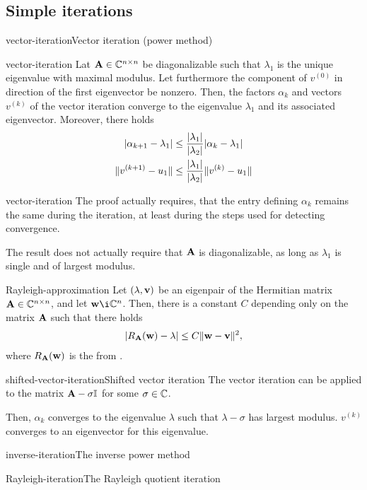 
\subsection{Simple iterations}

\begin{Algorithm*}{vector-iteration}{Vector iteration (power method)}
  
\end{Algorithm*}

\begin{Theorem}{vector-iteration}
  Lat $\mathbf A\in\mathbb C^{n\times n}$ be diagonalizable such that $\lambda_1$ is the
  unique eigenvalue with maximal modulus. Let furthermore the
  component of $v^{(0)}$ in direction of the first eigenvector be
  nonzero. Then, the factors $\alpha_k$ and vectors $v^{(k)}$ of the
  vector iteration converge to the eigenvalue $\lambda_1$ and its
  associated eigenvector. Moreover, there holds
  \begin{align}
    \lvert\alpha_{k+1}-\lambda_1\rvert
    &\le \frac{\lvert\lambda_1\rvert}{\lvert\lambda_2\rvert} \lvert\alpha_{k}-\lambda_1\rvert\\
    \lVert v^{(k+1)}-u_1\rVert
    &\le \frac{\lvert\lambda_1\rvert}{\lvert\lambda_2\rvert} \lVert v^{(k)}-u_1\rVert
  \end{align}
\end{Theorem}

\begin{Remark}{vector-iteration}
  The proof actually requires, that the entry defining $\alpha_k$
  remains the same during the iteration, at least during the steps
  used for detecting convergence.

  The result does not actually require that $\mathbf A$ is diagonalizable,
  as long as $\lambda_1$ is single and of largest modulus.
\end{Remark}

\begin{Lemma}{Rayleigh-approximation}
  Let $(\lambda,\mathbf v)$ be an eigenpair of the Hermitian matrix
  $\mathbf A\in\mathbb C^{n\times n}$, and let $\vw\i\C^n$. Then, there is a constant $C$ depending only on the matrix $\mathbf A$ such that there holds
  \begin{gather}
    \lvert R_\mathbf A(\mathbf w)-\lambda\rvert \le C \lVert\mathbf w-\mathbf v\rVert^2,
  \end{gather}
  where $R_\mathbf A(\mathbf w)$ is the  from
  .
\end{Lemma}

\begin{Algorithm*}{shifted-vector-iteration}{Shifted vector iteration}
  The vector iteration can be applied to the matrix $\mathbf A-\sigma\mathbb I$
  for some $\sigma\in\mathbb C$.

  Then, $\alpha_k$ converges to the eigenvalue $\lambda$ such that
  $\lambda-\sigma$ has largest modulus. $v^{(k)}$ converges to an
  eigenvector for this eigenvalue.
\end{Algorithm*}

\begin{Algorithm*}{inverse-iteration}{The inverse power method}
  
\end{Algorithm*}

\begin{Algorithm*}{Rayleigh-iteration}{The Rayleigh quotient iteration}
  
\end{Algorithm*}


